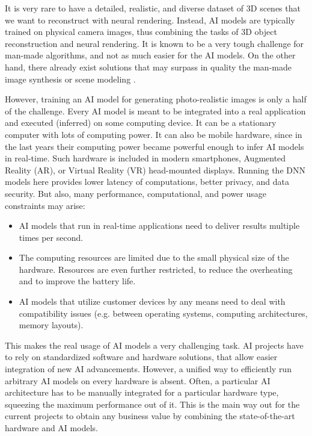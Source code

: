 It is very rare to have a detailed, realistic, and diverse dataset of 3D scenes that we want to reconstruct with neural rendering. Instead, AI models are typically trained on physical camera images, thus combining the tasks of 3D object reconstruction and neural rendering. It is known to be a very tough challenge for man-made algorithms, and not as much easier for the AI models. On the other hand, there already exist solutions that may surpass in quality the man-made image synthesis or scene modeling \cite{dnn:stylegan-v1-19,dnn:stylegan-v2-20,dnn:stylegan-v3-21,dnn:nerf20}.
 
However, training an AI model for generating photo-realistic images is only a half of the challenge. Every AI model is meant to be integrated into a real application and executed (inferred) on some computing device. It can be a stationary computer with lots of computing power. It can also be mobile hardware, since in the last years their computing power became powerful enough to infer AI models in real-time. Such hardware is included in modern smartphones, Augmented Reality (AR), or Virtual Reality (VR) head-mounted displays. Running the DNN models here provides lower latency of computations, better privacy, and data security. But also, many performance, computational, and power usage constraints may arise:
\begin{itemize}
	\item  AI models that run in real-time applications need to deliver results multiple times per second.
	\item  The computing resources are limited due to the small physical size of the hardware. Resources are even further restricted, to reduce the overheating and to improve the battery life.
	\item  AI models that utilize customer devices by any means need to deal with compatibility issues (e.g. between operating systems, computing architectures, memory layouts).
\end{itemize}

This makes the real usage of AI models a very challenging task. AI projects have to rely on standardized software and hardware solutions, that allow easier integration of new AI advancements. However, a unified way to efficiently run arbitrary AI models on every hardware is absent. Often, a particular AI architecture has to be manually integrated for a particular hardware type, squeezing the maximum performance out of it. This is the main way out for the current projects to obtain any business value by  combining the state-of-the-art hardware and AI models.
 
